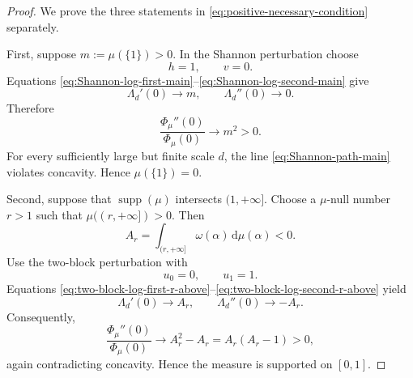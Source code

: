 \documentclass[aps,pra,11pt,onecolumn,nofootinbib,tightenlines]{revtex4-2}
\theoremstyle{definition}
\begin{document}
\begin{proof}
We prove the three statements in \eqref{eq:positive-necessary-condition} separately.

First, suppose $m:=\mu(\{1\})>0$. In the Shannon perturbation choose
\begin{equation}
 h=1,
 \qquad
 v=0.
 \label{eq:positive-atom-choice}
\end{equation}
Equations \eqref{eq:Shannon-log-first-main}--\eqref{eq:Shannon-log-second-main} give
\begin{equation}
 \Lambda_d'(0)\longrightarrow m,
 \qquad
 \Lambda_d''(0)\longrightarrow0.
 \label{eq:positive-atom-Lambda-limits}
\end{equation}
Therefore
\begin{equation}
 \frac{\Phi_\mu''(0)}{\Phi_\mu(0)}
 \longrightarrow m^2>0.
 \label{eq:positive-atom-curvature}
\end{equation}
For every sufficiently large but finite scale $d$, the line \eqref{eq:Shannon-path-main} violates concavity. Hence $\mu(\{1\})=0$.

Second, suppose that $\operatorname{supp}(\mu)$ intersects $(1,+\infty]$. Choose a $\mu$-null number $r>1$ such that $\mu((r,+\infty])>0$. Then
\begin{equation}
 A_r=\int_{(r,+\infty]}\omega(\alpha)\,\mathrm d\mu(\alpha)<0.
 \label{eq:positive-tail-A-negative}
\end{equation}
Use the two-block perturbation with
\begin{equation}
 u_0=0,
 \qquad
 u_1=1.
 \label{eq:positive-tail-velocities}
\end{equation}
Equations \eqref{eq:two-block-log-first-r-above}--\eqref{eq:two-block-log-second-r-above} yield
\begin{equation}
 \Lambda_d'(0)\longrightarrow A_r,
 \qquad
 \Lambda_d''(0)\longrightarrow-A_r.
 \label{eq:positive-tail-Lambda-limits}
\end{equation}
Consequently,
\begin{equation}
 \frac{\Phi_\mu''(0)}{\Phi_\mu(0)}
 \longrightarrow A_r^2-A_r
 =A_r(A_r-1)>0,
 \label{eq:positive-tail-curvature}
\end{equation}
again contradicting concavity. Hence the measure is supported on $[0,1]$.


\end{proof}
\end{document}
